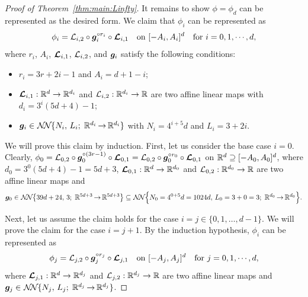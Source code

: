 \documentclass[nohyperref]{article}
\theoremstyle{plain}
\theoremstyle{definition}
\theoremstyle{remark}
\begin{document}
\begin{proof}[Proof of Theorem~\ref{thm:main:Linfty}]
	
It remains to show $\phi=\phi_d$ can be represented as the desired form.	
	We claim that $\phi_i$ can be represented as 
	\begin{equation*}
		\phi_i=\calL_{i,2}\circ \bmg_i^{\circ r_i}\circ\bmcalL_{i,1} \quad \tn{on $[-A_i,A_i]^d$\quad for $i=0,1,\dotsc,d$},
	\end{equation*}
where 
$r_i$, $A_i$, ${\bm{\mathcal{L}}}_{i,1}$, ${\mathcal{L}}_{i,2}$, and ${\bm{g}}_i$ satisfy the following conditions:
\begin{itemize}
	\item $r_i=3r+2i-1$ and $A_i=d+1-i$;
	\item $\bmcalL_{i,1}:\R^d\to\R^{d_i}$ and $\calL_{i,2}:\R^{d_i}\to\R$ are two affine linear maps with $d_i=3^i(5d+4)-1$;
	\item $\bmg_i\in \nn{N_i }{L_i}{d_i}{d_i}$ with $N_i=4^{i+5}d$ and $L_i=3+2i$. 
\end{itemize}

	
	


	
	We will prove this claim by induction. First, let us consider the base case $i=0$. Clearly, $\phi_0= {\mathcal{L}}_{0,2}\circ {\bm{g}}_0^{\circ (3r-1)}\circ {\bm{\mathcal{L}}}_{0,1}={\mathcal{L}}_{0,2}\circ {\bm{g}}_0^{\circ r_0}\circ {\bm{\mathcal{L}}}_{0,1}$ on $\R^d\supseteq [-A_0,A_0]^d$, where 	$d_0=3^{0}(5d+4)-1=5d+3$, $\bmcalL_{0,1}:\R^d\to\R^{d_0}$ and $\calL_{0,2}:\R^{d_0}\to\R$ are two affine linear maps and
	\begin{equation*}
		\bmg_0\in \nn[\big]{39d+24}{3}{5d+3}{5d+3}\subseteq \nn[\Big]{N_0=4^{0+5} d=1024d}{L_0=3+0=3}{d_0}{d_0}.
	\end{equation*}

	
	Next, let us assume the claim holds for the case $i=j\in \{0,1,\dotsc,d-1\}$. We will prove the claim for the case $i=j+1$.
	By the induction hypothesis, 	 $\phi_i$ can be represented as 
	\begin{equation*}
		\phi_j=\calL_{j,2}\circ \bmg_j^{\circ r_j}\circ\bmcalL_{j,1} \quad \tn{on $[-A_j,A_j]^d$\quad for $j=0,1,\dotsc,d$},
	\end{equation*}
	where $\bmcalL_{j,1}:\R^d\to\R^{d_j}$ and $\calL_{j,2}:\R^{d_j}\to\R$ are two affine linear maps  and $\bmg_j\in \nn{N_j}{L_j}{d_j}{d_j}$.
	

\end{proof}
\end{document}
